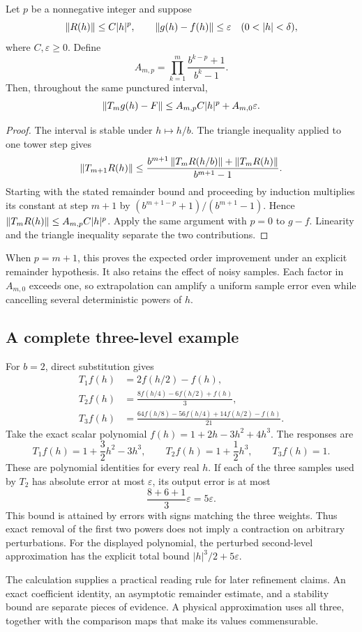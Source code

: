 \begin{theorem}
Let $p$ be a nonnegative integer and suppose
\[
 \norm{R(h)}\leq C|h|^p,\qquad
 \norm{g(h)-f(h)}\leq\varepsilon
 \quad(0<|h|<\delta),
\]
where $C,\varepsilon\geq0$. Define
\[
 A_{m,p}=\prod_{k=1}^{m}\frac{b^{k-p}+1}{b^k-1}.
\]
Then, throughout the same punctured interval,
\[
 \left\lVert T_mg(h)-F\right\rVert\leq A_{m,p}C|h|^p+A_{m,0}\varepsilon.
\]
\end{theorem}
\begin{proof}
The interval is stable under $h\mapsto h/b$. The triangle inequality applied to one tower step gives
\[
 \left\lVert T_{m+1}R(h)\right\rVert\leq
 \frac{b^{m+1}\left\lVert T_mR(h/b)\right\rVert+\left\lVert T_mR(h)\right\rVert}{b^{m+1}-1}.
\]
Starting with the stated remainder bound and proceeding by induction multiplies its constant at step $m+1$ by $(b^{m+1-p}+1)/(b^{m+1}-1)$. Hence $\left\lVert T_mR(h)\right\rVert\leq A_{m,p}C|h|^p$. Apply the same argument with $p=0$ to $g-f$. Linearity and the triangle inequality separate the two contributions.
\end{proof}

When $p=m+1$, this proves the expected order improvement under an explicit remainder hypothesis. It also retains the effect of noisy samples. Each factor in $A_{m,0}$ exceeds one, so extrapolation can amplify a uniform sample error even while cancelling several deterministic powers of $h$.

\subsection{A complete three-level example}
For $b=2$, direct substitution gives
\begin{align*}
 T_1f(h)&=2f(h/2)-f(h),\\
 T_2f(h)&=\frac{8f(h/4)-6f(h/2)+f(h)}{3},\\
 T_3f(h)&=\frac{64f(h/8)-56f(h/4)+14f(h/2)-f(h)}{21}.
\end{align*}
Take the exact scalar polynomial $f(h)=1+2h-3h^2+4h^3$. The responses are
\[
 T_1f(h)=1+\frac32h^2-3h^3,\qquad
 T_2f(h)=1+\frac12h^3,\qquad T_3f(h)=1.
\]
These are polynomial identities for every real $h$. If each of the three samples used by $T_2$ has absolute error at most $\varepsilon$, its output error is at most
\[
 \frac{8+6+1}{3}\varepsilon=5\varepsilon.
\]
This bound is attained by errors with signs matching the three weights. Thus exact removal of the first two powers does not imply a contraction on arbitrary perturbations. For the displayed polynomial, the perturbed second-level approximation has the explicit total bound $|h|^3/2+5\varepsilon$.

The calculation supplies a practical reading rule for later refinement claims. An exact coefficient identity, an asymptotic remainder estimate, and a stability bound are separate pieces of evidence. A physical approximation uses all three, together with the comparison maps that make its values commensurable.



